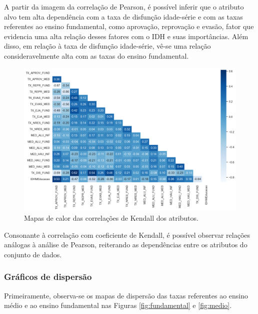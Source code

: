\par A partir da imagem da correlação de Pearson, é possível inferir que o atributo alvo tem alta dependência com a taxa de disfunção idade-série e com as taxas referentes ao ensino fundamental, como aprovação, reprovação e evasão, fator que evidencia uma alta relação desses fatores com o IDH e suas importâncias. Além disso, em relação à taxa de disfunção idade-série, vê-se uma relação consideravelmente alta com as taxas do ensino fundamental.

\begin{figure}
    \centering
    \includegraphics[width=1\linewidth]{Graphics/HeatMapKendall.png}
    \caption{Mapas de calor das correlações de Kendall dos atributos.}
    \label{fig:heat-kend}
\end{figure}

\par Consonante à correlação com coeficiente de Kendall, é possível observar relações análogas à análise de Pearson, reiterando as dependências entre os atributos do conjunto de dados.

\subsubsection{Gráficos de dispersão}

\par Primeiramente, observa-se os mapas de dispersão das taxas referentes ao ensino médio e ao ensino fundamental nas Figuras \ref{fig:fundamental} e \ref{fig:medio}.
 
